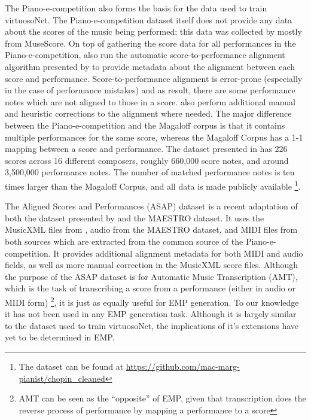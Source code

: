 The Piano-e-competition also forms the basis for the data used to train virtuosoNet. The Piano-e-competition dataset itself does not provide any data about the scores of the music being performed; this data was collected by \citet{jeong2019virtuosonet} mostly from MuseScore. On top of gathering the score data for all performances in the Piano-e-competition, \citeauthor{jeong2019virtuosonet}  also run the automatic score-to-performance alignment algorithm presented by \citet{nakamura2017performance} to provide metadata about the alignment between each score and performance. Score-to-performance alignment is error-prone (especially in the case of performance mistakes) and as result, there are some performance notes which are not aligned to those in a score. \citet{jeong2019virtuosonet} also perform additional manual and heuristic corrections to the alignment where needed. The major difference between the Piano-e-competition and the Magaloff corpus is that it contains multiple performances for the same score, whereas the Magaloff Corpus has a 1-1 mapping between a score and performance. The dataset presented in \cite{jeong2019virtuosonet}  has 226 scores across 16 different composers, roughly 660,000 score notes, and around 3,500,000 performance notes. The number of matched performance notes is ten times larger than the Magaloff Corpus, and all data is made publicly available \footnote{The dataset can be found at \url{https://github.com/mac-marg-pianist/chopin_cleaned}}. 

The Aligned Scores and Performances (ASAP) dataset \cite{foscarin2020asap} is a recent adaptation of both the dataset presented by \citet{jeong2019virtuosonet} and the MAESTRO dataset. It uses the MusicXML files from \citet{jeong2019virtuosonet}, audio from the MAESTRO dataset, and MIDI files from both sources which are extracted from the common source of the Piano-e-competition. It provides additional alignment metadata for both MIDI and audio fields, as well as more manual correction in the MusicXML score files. Although the purpose of the ASAP dataset is for Automatic Music Transcription (AMT), which is the task of transcribing a score from a performance (either in audio or MIDI form) \footnote{AMT can be seen as the ``opposite'' of EMP, given that transcription does the reverse process of performance by mapping a performance to a score}, it is just as equally useful for EMP generation. To our knowledge it has not been used in any EMP generation task. Although it is largely similar to the dataset used to train virtuosoNet, the implications of it's extensions have yet to be determined in EMP. 


